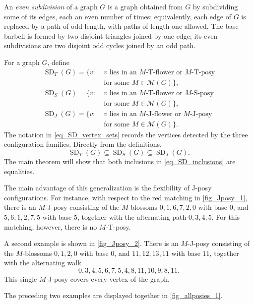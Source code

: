 \documentclass[preprint,12pt]{elsarticle}
\theoremstyle{plain}
\newcommand{\SD}{\operatorname{SD}}
\begin{document}
An \emph{even subdivision} of a graph \(G\) is a graph obtained from \(G\) by subdividing some of its edges, each an even number of times; equivalently, each edge of \(G\) is replaced by a path of odd length, with paths of length one allowed.  The base barbell is formed by two disjoint triangles joined by one edge; its even subdivisions are two disjoint odd cycles joined by an odd path.




For a graph \(G\), define
\begin{equation}\label{eq_SD_vertex_sets}
\begin{aligned}
\SD_T(G)=\{v:\;&v\text{ lies in an }M\text{-T-flower or }M\text{-T-posy}\\
             &\text{for some }M\in\mathcal M(G)\},\\
\SD_S(G)=\{v:\;&v\text{ lies in an }M\text{-T-flower or }M\text{-S-posy}\\
             &\text{for some }M\in\mathcal M(G)\},\\
\SD_J(G)=\{v:\;&v\text{ lies in an }M\text{-J-flower or }M\text{-J-posy}\\
             &\text{for some }M\in\mathcal M(G)\}.
\end{aligned}
\end{equation}
The notation in \cref{eq_SD_vertex_sets} records the vertices detected by the
three configuration families. Directly from the definitions,
\begin{equation}\label{eq_SD_inclusions}
\SD_T(G)\subseteq\SD_S(G)\subseteq\SD_J(G).
\end{equation}
The main theorem will show that both inclusions in
\cref{eq_SD_inclusions} are equalities.

The main advantage of this generalization is the flexibility of J-posy configurations. For instance, with respect to the red matching in \cref{fig_Jposy_1}, there is an \(M\)-J-posy consisting of the \(M\)-blossoms \(0,1,6,7,2,0\) with base \(0\), and \(5,6,1,2,7,5\) with base \(5\), together with the alternating path $0,3,4,5$. For this matching, however, there is no \(M\)-T-posy.

A second example is shown in \cref{fig_Jposy_2}. There is an \(M\)-J-posy consisting of the \(M\)-blossoms \(0,1,2,0\) with base \(0\), and \(11,12,13,11\) with base \(11\), together with the alternating walk
\[
0,3,4,5,6,7,5,4,8,11,10,9,8,11.
\]
This single \(M\)-J-posy covers every vertex of the graph.

The preceding two examples are displayed together in \cref{fig_allposies_1}.
\end{document}
